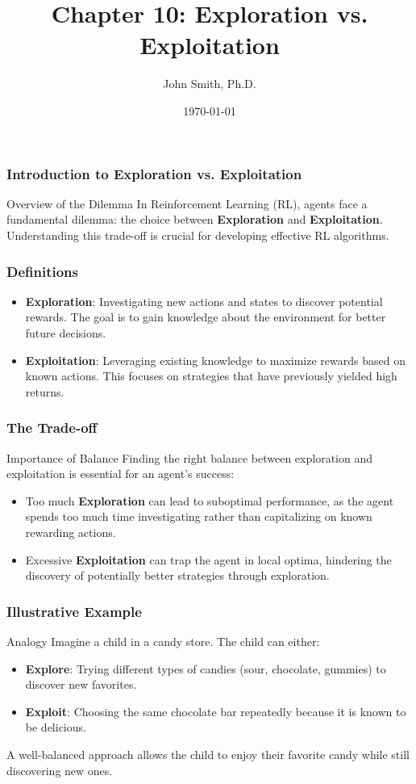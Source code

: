 \documentclass[aspectratio=169]{beamer}
\title[Exploration vs. Exploitation]{Chapter 10: Exploration vs. Exploitation}
\author[J. Smith]{John Smith, Ph.D.}
\institute[University Name]{
  Department of Computer Science\\
  University Name\\
  \vspace{0.3cm}
  Email: email@university.edu\\
  Website: www.university.edu
}
\date{\today}
\begin{document}
\frame{\titlepage}

\begin{frame}
    \frametitle{Introduction to Exploration vs. Exploitation}
    \begin{block}{Overview of the Dilemma}
        In Reinforcement Learning (RL), agents face a fundamental dilemma: the choice between \textbf{Exploration} and \textbf{Exploitation}. Understanding this trade-off is crucial for developing effective RL algorithms.
    \end{block}
\end{frame}

\begin{frame}
    \frametitle{Definitions}
    \begin{itemize}
        \item \textbf{Exploration}: Investigating new actions and states to discover potential rewards. The goal is to gain knowledge about the environment for better future decisions.
        
        \item \textbf{Exploitation}: Leveraging existing knowledge to maximize rewards based on known actions. This focuses on strategies that have previously yielded high returns.
    \end{itemize}
\end{frame}

\begin{frame}
    \frametitle{The Trade-off}
    \begin{block}{Importance of Balance}
        Finding the right balance between exploration and exploitation is essential for an agent's success:
    \end{block}
    \begin{itemize}
        \item Too much \textbf{Exploration} can lead to suboptimal performance, as the agent spends too much time investigating rather than capitalizing on known rewarding actions.

        \item Excessive \textbf{Exploitation} can trap the agent in local optima, hindering the discovery of potentially better strategies through exploration.
    \end{itemize}
\end{frame}

\begin{frame}
    \frametitle{Illustrative Example}
    \begin{block}{Analogy}
        Imagine a child in a candy store. The child can either:
    \end{block}
    \begin{itemize}
        \item \textbf{Explore}: Trying different types of candies (sour, chocolate, gummies) to discover new favorites.
        
        \item \textbf{Exploit}: Choosing the same chocolate bar repeatedly because it is known to be delicious.
    \end{itemize}
    A well-balanced approach allows the child to enjoy their favorite candy while still discovering new ones.
\end{frame}
\end{document}
